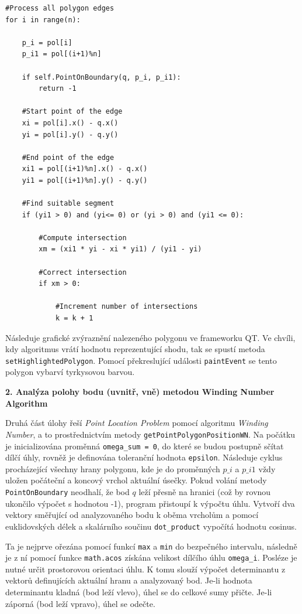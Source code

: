 \documentclass[12pt]{article}
\begin{document}
\newpage
\begin{lstlisting}[caption={Procházení hran polygonu pomocí for cyklu}]
#Process all polygon edges
for i in range(n):
    
    p_i = pol[i]
    p_i1 = pol[(i+1)%n]
    
    if self.PointOnBoundary(q, p_i, p_i1):
        return -1
    
    #Start point of the edge
    xi = pol[i].x() - q.x()
    yi = pol[i].y() - q.y()
    
    #End point of the edge        
    xi1 = pol[(i+1)%n].x() - q.x()
    yi1 = pol[(i+1)%n].y() - q.y()
    
    #Find suitable segment
    if (yi1 > 0) and (yi<= 0) or (yi > 0) and (yi1 <= 0):
        
        #Compute intersection
        xm = (xi1 * yi - xi * yi1) / (yi1 - yi) 
        
        #Correct intersection
        if xm > 0:
            
            #Increment number of intersections
            k = k + 1

\end{lstlisting}

Následuje grafické zvýraznění nalezeného polygonu ve frameworku QT. Ve chvíli, kdy algoritmus vrátí hodnotu reprezentující shodu, tak se spustí metoda \texttt{setHighlightedPolygon}. Pomocí překreslující události \texttt{paintEvent} se tento polygon vybarví tyrkysovou barvou.

\textbf{2. Analýza polohy bodu (uvnitř, vně) metodou Winding Number Algorithm}

Druhá část úlohy řeší \emph{Point Location Problem} pomocí algoritmu \emph{Winding Number}, a to prostřednictvím metody \texttt{getPointPolygonPositionWN}. Na počátku je inicializována proměnná \texttt{omega\_sum = 0}, do které se budou postupně sčítat dílčí úhly, rovněž je definována toleranční hodnota \texttt{epsilon}. Následuje cyklus procházející všechny hrany polygonu, kde je do proměnných $p\_i$ a $p\_i1$ vždy uložen počáteční a koncový vrchol aktuální úsečky. Pokud volání metody \texttt{PointOnBoundary} neodhalí, že bod $q$ leží přesně na hranici (což by rovnou ukončilo výpočet s hodnotou -1), program přistoupí k výpočtu úhlu. Vytvoří dva vektory směřující od analyzovaného bodu k oběma vrcholům a pomocí euklidovských délek a skalárního součinu \texttt{dot\_product} vypočítá hodnotu cosinus.

\newpage
Ta je nejprve ořezána pomocí funkcí \texttt{max} a \texttt{min} do bezpečného intervalu, následně je z ní pomocí funkce \texttt{math.acos} získána velikost dílčího úhlu \texttt{omega\_i}. Posléze je nutné určit prostorovou orientaci úhlu. K tomu slouží výpočet determinantu z vektorů definujících aktuální hranu a analyzovaný bod. Je-li hodnota determinantu kladná (bod leží vlevo), úhel se do celkové sumy přičte. Je-li záporná (bod leží vpravo), úhel se odečte.
\end{document}
